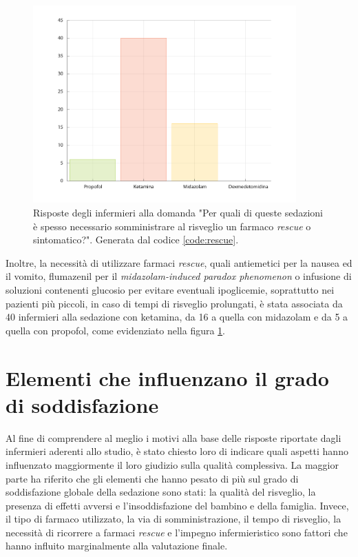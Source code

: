\begin{figure}[!h]
    \centering
    \includegraphics[width=0.9\textwidth]{Figure/rescue (1).pdf}
    \caption{Risposte degli infermieri alla domanda "Per quali di queste sedazioni è spesso necessario somministrare al risveglio un farmaco \emph{rescue} o sintomatico?". Generata dal codice \ref{code:rescue}.}
    \label{fig:rescue}
\end{figure}

Inoltre, la necessità di utilizzare farmaci \emph{rescue}, quali antiemetici per la nausea ed il vomito, flumazenil per il \emph{midazolam-induced paradox phenomenon} o infusione di soluzioni contenenti glucosio per evitare eventuali ipoglicemie, soprattutto nei pazienti più piccoli, in caso di tempi di risveglio prolungati, è stata associata da 40 infermieri alla sedazione con ketamina, da 16 a quella con midazolam e da 5 a quella con propofol, come evidenziato nella figura \ref{fig:rescue}.


\section{Elementi che influenzano il grado di soddisfazione}

Al fine di comprendere al meglio i motivi alla base delle risposte riportate dagli infermieri aderenti allo studio, è stato chiesto loro di indicare quali aspetti hanno influenzato maggiormente il loro giudizio sulla qualità complessiva. La maggior parte ha riferito che gli elementi che hanno pesato di più sul grado di soddisfazione globale della sedazione sono stati: la qualità del risveglio, la presenza di effetti avversi e l'insoddisfazione del bambino e della famiglia. Invece, il tipo di farmaco utilizzato, la via di somministrazione, il tempo di risveglio, la necessità di ricorrere a farmaci \emph{rescue} e l'impegno infermieristico sono fattori che hanno influito marginalmente alla valutazione finale.

